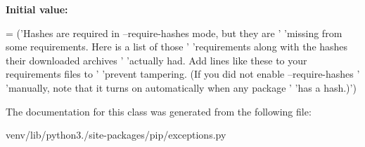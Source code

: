 {\bfseries Initial value\+:}
\begin{DoxyCode}
=  (\textcolor{stringliteral}{'Hashes are required in --require-hashes mode, but they are '}
            \textcolor{stringliteral}{'missing from some requirements. Here is a list of those '}
            \textcolor{stringliteral}{'requirements along with the hashes their downloaded archives '}
            \textcolor{stringliteral}{'actually had. Add lines like these to your requirements files to '}
            \textcolor{stringliteral}{'prevent tampering. (If you did not enable --require-hashes '}
            \textcolor{stringliteral}{'manually, note that it turns on automatically when any package '}
            \textcolor{stringliteral}{'has a hash.)'})
\end{DoxyCode}


The documentation for this class was generated from the following file\+:\begin{DoxyCompactItemize}
\item 
venv/lib/python3./site-\/packages/pip/exceptions.\+py\end{DoxyCompactItemize}
